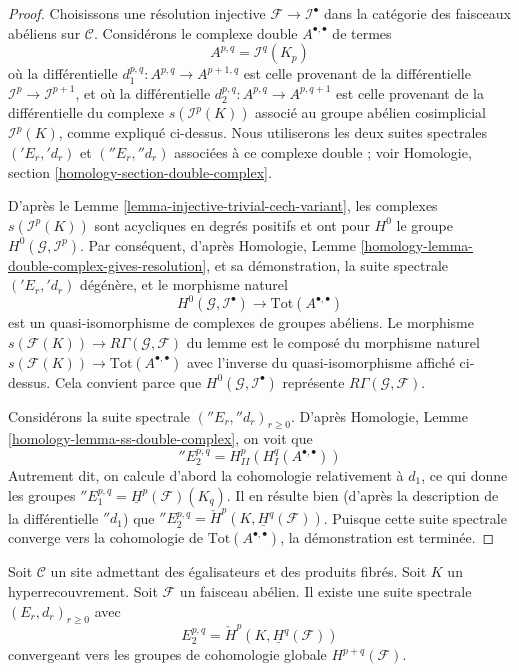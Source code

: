 \begin{proof}
Choisissons une résolution injective $\mathcal{F} \to \mathcal{I}^\bullet$
dans la catégorie des faisceaux abéliens sur $\mathcal{C}$. Considérons le
complexe double $A^{\bullet, \bullet}$ de termes
$$
A^{p, q} = \mathcal{I}^q(K_p)
$$
où la différentielle $d_1^{p, q} : A^{p, q} \to A^{p + 1, q}$
est celle provenant de la différentielle $\mathcal{I}^p \to \mathcal{I}^{p + 1}$,
et où la différentielle $d_2^{p, q} : A^{p, q} \to A^{p, q + 1}$ est
celle provenant de la différentielle du complexe
$s(\mathcal{I}^p(K))$ associé au groupe abélien cosimplicial
$\mathcal{I}^p(K)$, comme expliqué ci-dessus.
Nous utiliserons les deux suites
spectrales $({}'E_r, {}'d_r)$ et $({}''E_r, {}''d_r)$
associées à ce complexe double ; voir
Homologie, section \ref{homology-section-double-complex}.

\medskip\noindent
D'après le Lemme \ref{lemma-injective-trivial-cech-variant}, les complexes
$s(\mathcal{I}^p(K))$ sont acycliques en degrés positifs et ont pour
$H^0$ le groupe $H^0(\mathcal{G}, \mathcal{I}^p)$. Par conséquent, d'après
Homologie, Lemme \ref{homology-lemma-double-complex-gives-resolution},
et sa démonstration, la suite spectrale $({}'E_r, {}'d_r)$ dégénère,
et le morphisme naturel
$$
H^0(\mathcal{G}, \mathcal{I}^\bullet) \longrightarrow
\text{Tot}(A^{\bullet, \bullet})
$$
est un quasi-isomorphisme de complexes de groupes abéliens. Le morphisme
$s(\mathcal{F}(K)) \longrightarrow R\Gamma(\mathcal{G}, \mathcal{F})$
du lemme est le composé du morphisme naturel
$s(\mathcal{F}(K)) \to \text{Tot}(A^{\bullet, \bullet})$
avec l'inverse du quasi-isomorphisme affiché ci-dessus.
Cela convient parce que $H^0(\mathcal{G}, \mathcal{I}^\bullet)$
représente $R\Gamma(\mathcal{G}, \mathcal{F})$.

\medskip\noindent
Considérons la suite spectrale $({}''E_r, {}''d_r)_{r \geq 0}$. D'après
Homologie, Lemme \ref{homology-lemma-ss-double-complex},
on voit que
$$
{}''E_2^{p, q} = H^p_{II}(H^q_I(A^{\bullet, \bullet}))
$$
Autrement dit, on calcule d'abord la cohomologie relativement à
$d_1$, ce qui donne les groupes
${}''E_1^{p, q} = \underline{H}^p(\mathcal{F})(K_q)$.
Il en résulte bien (d'après la description de la différentielle
${}''d_1$) que
${}''E_2^{p, q} = \check{H}^p(K, \underline{H}^q(\mathcal{F}))$.
Puisque cette suite spectrale converge vers la cohomologie de
$\text{Tot}(A^{\bullet, \bullet})$, la démonstration est terminée.
\end{proof}

\begin{lemma}
\label{lemma-cech-spectral-sequence-verdier}
Soit $\mathcal{C}$ un site admettant des égalisateurs et des produits fibrés.
Soit $K$ un hyperrecouvrement.
Soit $\mathcal{F}$ un faisceau abélien. Il existe une
suite spectrale $(E_r, d_r)_{r \geq 0}$ avec
$$
E_2^{p, q} = \check{H}^p(K, \underline{H}^q(\mathcal{F}))
$$
convergeant vers les groupes de cohomologie globale $H^{p + q}(\mathcal{F})$.
\end{lemma}

